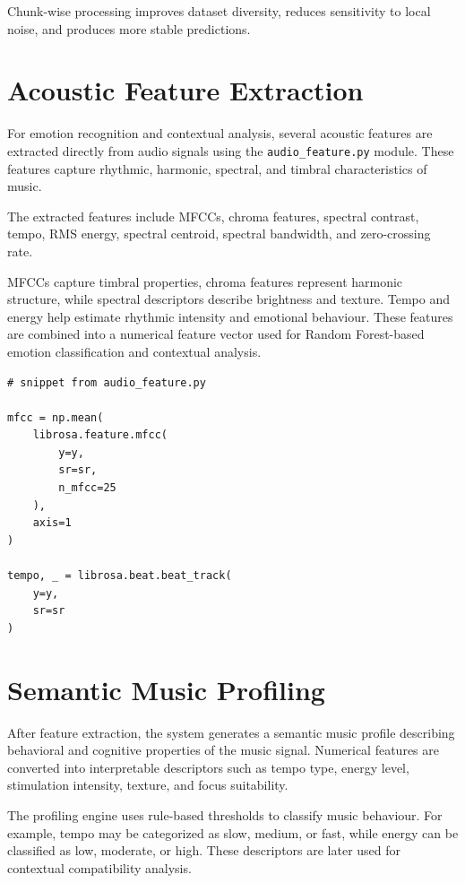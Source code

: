 \documentclass[12pt,a4paper]{report}
\begin{document}
Chunk-wise processing improves dataset diversity, reduces sensitivity to local noise, and produces more stable predictions.

\section{Acoustic Feature Extraction}

For emotion recognition and contextual analysis, several acoustic features are extracted directly from audio signals using the \texttt{audio\_feature.py} module. These features capture rhythmic, harmonic, spectral, and timbral characteristics of music.

The extracted features include MFCCs, chroma features, spectral contrast, tempo, RMS energy, spectral centroid, spectral bandwidth, and zero-crossing rate.

MFCCs capture timbral properties, chroma features represent harmonic structure, while spectral descriptors describe brightness and texture. Tempo and energy help estimate rhythmic intensity and emotional behaviour. These features are combined into a numerical feature vector used for Random Forest-based emotion classification and contextual analysis.

\begin{lstlisting}
# snippet from audio_feature.py

mfcc = np.mean(
    librosa.feature.mfcc(
        y=y,
        sr=sr,
        n_mfcc=25
    ),
    axis=1
)

tempo, _ = librosa.beat.beat_track(
    y=y,
    sr=sr
)
\end{lstlisting}

\section{Semantic Music Profiling}

After feature extraction, the system generates a semantic music profile describing behavioral and cognitive properties of the music signal. Numerical features are converted into interpretable descriptors such as tempo type, energy level, stimulation intensity, texture, and focus suitability.

The profiling engine uses rule-based thresholds to classify music behaviour. For example, tempo may be categorized as slow, medium, or fast, while energy can be classified as low, moderate, or high. These descriptors are later used for contextual compatibility analysis.
\end{document}
